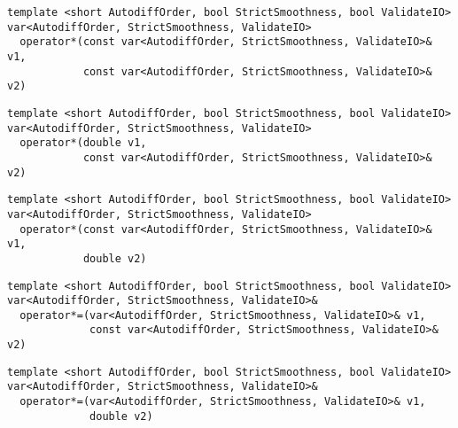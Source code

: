 \begin{tcolorbox}[colback=white,colframe=gray90, coltitle=black,boxrule=3pt,
fonttitle=\bfseries,title= Operator Multiplication]

\begin{verbatim}
template <short AutodiffOrder, bool StrictSmoothness, bool ValidateIO>
var<AutodiffOrder, StrictSmoothness, ValidateIO>
  operator*(const var<AutodiffOrder, StrictSmoothness, ValidateIO>& v1,
            const var<AutodiffOrder, StrictSmoothness, ValidateIO>& v2)

\end{verbatim}

\begin{verbatim}
template <short AutodiffOrder, bool StrictSmoothness, bool ValidateIO>
var<AutodiffOrder, StrictSmoothness, ValidateIO>
  operator*(double v1,
            const var<AutodiffOrder, StrictSmoothness, ValidateIO>& v2)

\end{verbatim}

\begin{verbatim}
template <short AutodiffOrder, bool StrictSmoothness, bool ValidateIO>
var<AutodiffOrder, StrictSmoothness, ValidateIO>
  operator*(const var<AutodiffOrder, StrictSmoothness, ValidateIO>& v1,
            double v2)

\end{verbatim}

\end{tcolorbox}

\begin{tcolorbox}[colback=white,colframe=gray90, coltitle=black,boxrule=3pt,
fonttitle=\bfseries,title= Operator Multiplication Assignment]

\begin{verbatim}
template <short AutodiffOrder, bool StrictSmoothness, bool ValidateIO>
var<AutodiffOrder, StrictSmoothness, ValidateIO>&
  operator*=(var<AutodiffOrder, StrictSmoothness, ValidateIO>& v1,
             const var<AutodiffOrder, StrictSmoothness, ValidateIO>& v2)

\end{verbatim}

\begin{verbatim}
template <short AutodiffOrder, bool StrictSmoothness, bool ValidateIO>
var<AutodiffOrder, StrictSmoothness, ValidateIO>&
  operator*=(var<AutodiffOrder, StrictSmoothness, ValidateIO>& v1,
             double v2)

\end{verbatim}

\end{tcolorbox}

